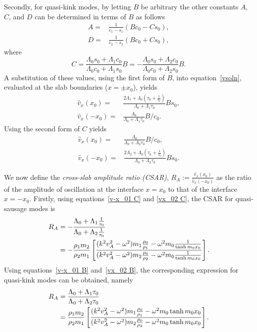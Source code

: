 \documentclass[namedreferences]{solarphysics}
\numberwithin{equation}{section}
\begin{document}
\begin{article}
Secondly, for quasi-kink modes, by letting $B$ be arbitrary the other constants $A$, $C$, and $D$ can be determined in terms of $B$ as follows
\begin{align}
A=&\frac{1}{c_1-s_1}(Bc_0-Cs_0), \label{constA B} \\ 
D=&\frac{1}{c_2-s_2}(Bc_0+Cs_0), \label{constD B}
\end{align}
where
\begin{equation}
C=\frac{\Lambda_0s_0+\Lambda_1c_0}{\Lambda_0c_0+\Lambda_1s_0}B=-\frac{\Lambda_0s_0+\Lambda_2c_0}{\Lambda_0c_0+\Lambda_2s_0}B. \label{constB B}
\end{equation}
A substitution of these values, using the first form of $B$, into equation~\eqref{vsoln}, evaluated at the slab boundaries ($x=\pm{}x_0$), yields
\begin{align}
\widehat{v}_x(x_0)=&\frac{2\Lambda_1+\Lambda_0\left(\tau_0+\frac{1}{\tau_0}\right)}{\Lambda_0+\Lambda_1\tau_0}Bs_0, \label{vx_01 B} \\
\widehat{v}_x(-x_0)=&\frac{\Lambda_0}{\Lambda_0+\Lambda_1\tau_0}B/c_0. \label{v-x_01 B}
\end{align}
Using the second form of $C$ yields
\begin{align}
\widehat{v}_x(x_0)=&\frac{\Lambda_0}{\Lambda_0+\Lambda_2\tau_0}B/c_0, \label{vx_02 B} \\
\widehat{v}_x(-x_0)=&\frac{2\Lambda_2+\Lambda_0\left(\tau_0+\frac{1}{\tau_0}\right)}{\Lambda_0+\Lambda_2\tau_0}Bs_0. \label{v-x_02 B}
\end{align}


We now define the \emph{cross-slab amplitude ratio (CSAR)}, $R_A:=\frac{\widehat{v}_x(x_0)}{\widehat{v}_x(-x_0)}$ as the ratio of the amplitude of oscillation at the interface $x=x_0$ to that of the interface $x=-x_0$. Firstly, using equations~\eqref{v-x_01 C} and \eqref{vx_02 C}, the CSAR for quasi-sausage modes is
\begin{align}
R_A &=-\frac{\Lambda_0+\Lambda_1\frac{1}{\tau_0}}{\Lambda_0+\Lambda_2\frac{1}{\tau_0}} \notag \\
	&=-\frac{\rho_1m_2}{\rho_2m_1}\left[\frac{(k^2v_A^2-\omega^2)m_1\frac{\rho_0}{\rho_1}-\omega^2m_0\frac{1}{\tanh{m_0x_0}}}{(k^2v_A^2-\omega^2)m_2\frac{\rho_0}{\rho_2}-\omega^2m_0\frac{1}{\tanh{m_0x_0}}}\right]. \label{cross-slab ratio saus}
\end{align}
Using equations~\eqref{v-x_01 B} and~\eqref{vx_02 B}, the corresponding expression for quasi-kink modes can be obtained, namely
\begin{align}
R_A&=\frac{\Lambda_0+\Lambda_1\tau_0}{\Lambda_0+\Lambda_2\tau_0} \notag \\
	&=\frac{\rho_1m_2}{\rho_2m_1}\left[\frac{(k^2v_A^2-\omega^2)m_1\frac{\rho_0}{\rho_1}-\omega^2m_0\tanh{m_0x_0}}{(k^2v_A^2-\omega^2)m_2\frac{\rho_0}{\rho_2}-\omega^2m_0\tanh{m_0x_0}}\right]. \label{cross-slab ratio kink}
\end{align}


\end{article}
\end{document}
